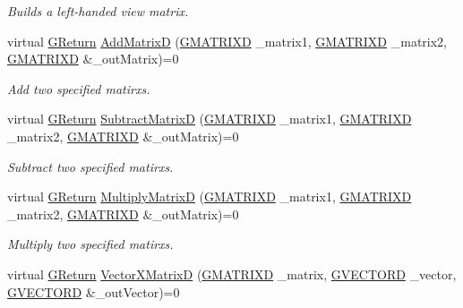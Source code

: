 \begin{DoxyCompactItemize}
\begin{DoxyCompactList}\small\item\em Builds a left-\/handed view matrix. \end{DoxyCompactList}\item 
virtual \hyperlink{namespaceGW_a67a839e3df7ea8a5c5686613a7a3de21}{G\+Return} \hyperlink{classGW_1_1MATH_1_1GMatrix_a9ae855c7cfbfa08c84bd76a556302bc5}{Add\+MatrixD} (\hyperlink{structGW_1_1MATH_1_1GMATRIXD}{G\+M\+A\+T\+R\+I\+XD} \+\_\+matrix1, \hyperlink{structGW_1_1MATH_1_1GMATRIXD}{G\+M\+A\+T\+R\+I\+XD} \+\_\+matrix2, \hyperlink{structGW_1_1MATH_1_1GMATRIXD}{G\+M\+A\+T\+R\+I\+XD} \&\+\_\+out\+Matrix)=0
\begin{DoxyCompactList}\small\item\em Add two specified matirxs. \end{DoxyCompactList}\item 
virtual \hyperlink{namespaceGW_a67a839e3df7ea8a5c5686613a7a3de21}{G\+Return} \hyperlink{classGW_1_1MATH_1_1GMatrix_a64478828c2d51b739dd116d948cb4ac3}{Subtract\+MatrixD} (\hyperlink{structGW_1_1MATH_1_1GMATRIXD}{G\+M\+A\+T\+R\+I\+XD} \+\_\+matrix1, \hyperlink{structGW_1_1MATH_1_1GMATRIXD}{G\+M\+A\+T\+R\+I\+XD} \+\_\+matrix2, \hyperlink{structGW_1_1MATH_1_1GMATRIXD}{G\+M\+A\+T\+R\+I\+XD} \&\+\_\+out\+Matrix)=0
\begin{DoxyCompactList}\small\item\em Subtract two specified matirxs. \end{DoxyCompactList}\item 
virtual \hyperlink{namespaceGW_a67a839e3df7ea8a5c5686613a7a3de21}{G\+Return} \hyperlink{classGW_1_1MATH_1_1GMatrix_a613bcf953961899b45e6d97fc5afc2e1}{Multiply\+MatrixD} (\hyperlink{structGW_1_1MATH_1_1GMATRIXD}{G\+M\+A\+T\+R\+I\+XD} \+\_\+matrix1, \hyperlink{structGW_1_1MATH_1_1GMATRIXD}{G\+M\+A\+T\+R\+I\+XD} \+\_\+matrix2, \hyperlink{structGW_1_1MATH_1_1GMATRIXD}{G\+M\+A\+T\+R\+I\+XD} \&\+\_\+out\+Matrix)=0
\begin{DoxyCompactList}\small\item\em Multiply two specified matirxs. \end{DoxyCompactList}\item 
virtual \hyperlink{namespaceGW_a67a839e3df7ea8a5c5686613a7a3de21}{G\+Return} \hyperlink{classGW_1_1MATH_1_1GMatrix_a97cb7b6353e8f89405e44b09390a67cb}{Vector\+X\+MatrixD} (\hyperlink{structGW_1_1MATH_1_1GMATRIXD}{G\+M\+A\+T\+R\+I\+XD} \+\_\+matrix, \hyperlink{structGW_1_1MATH_1_1GVECTORD}{G\+V\+E\+C\+T\+O\+RD} \+\_\+vector, \hyperlink{structGW_1_1MATH_1_1GVECTORD}{G\+V\+E\+C\+T\+O\+RD} \&\+\_\+out\+Vector)=0

\end{DoxyCompactItemize}
